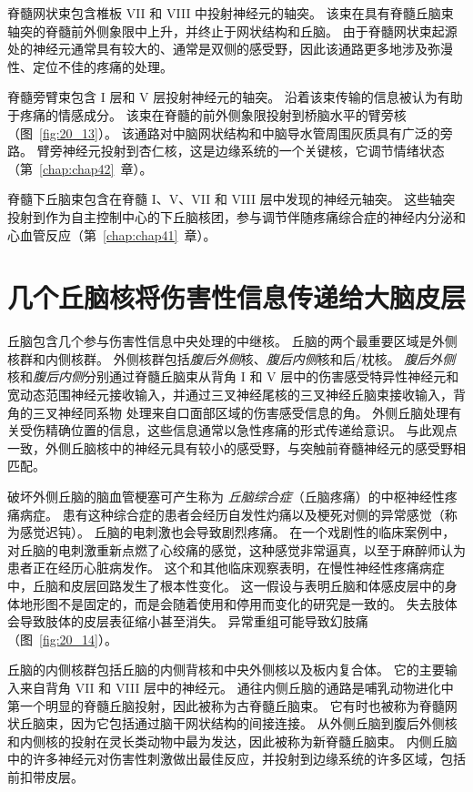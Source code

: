 脊髓网状束包含椎板 VII 和 VIII 中投射神经元的轴突。
该束在具有脊髓丘脑束轴突的脊髓前外侧象限中上升，并终止于网状结构和丘脑。
由于脊髓网状束起源处的神经元通常具有较大的、通常是双侧的感受野，因此该通路更多地涉及弥漫性、定位不佳的疼痛的处理。


脊髓旁臂束包含 I 层和 V 层投射神经元的轴突。
沿着该束传输的信息被认为有助于疼痛的情感成分。
该束在脊髓的前外侧象限投射到桥脑水平的臂旁核（图~\ref{fig:20_13}）。
该通路对中脑网状结构和中脑导水管周围灰质具有广泛的旁路。
臂旁神经元投射到杏仁核，这是边缘系统的一个关键核，它调节情绪状态（第~\ref{chap:chap42}~章）。


脊髓下丘脑束包含在脊髓 I、V、VII 和 VIII 层中发现的神经元轴突。
这些轴突投射到作为自主控制中心的下丘脑核团，参与调节伴随疼痛综合症的神经内分泌和心血管反应（第~\ref{chap:chap41}~章）。



\section{几个丘脑核将伤害性信息传递给大脑皮层}

丘脑包含几个参与伤害性信息中央处理的中继核。
丘脑的两个最重要区域是外侧核群和内侧核群。
外侧核群包括\textit{腹后外侧}核、\textit{腹后内侧}核和后/枕核。
\textit{腹后外侧}核和\textit{腹后内侧}分别通过脊髓丘脑束从背角 I 和 V 层中的伤害感受特异性神经元和宽动态范围神经元接收输入，并通过三叉神经尾核的三叉神经丘脑束接收输入，背角的三叉神经同系物 处理来自口面部区域的伤害感受信息的角。
外侧丘脑处理有关受伤精确位置的信息，这些信息通常以急性疼痛的形式传递给意识。
与此观点一致，外侧丘脑核中的神经元具有较小的感受野，与突触前脊髓神经元的感受野相匹配。


破坏外侧丘脑的脑血管梗塞可产生称为 \textit{丘脑综合症}（丘脑疼痛）的中枢神经性疼痛病症。
患有这种综合症的患者会经历自发性灼痛以及梗死对侧的异常感觉（称为感觉迟钝）。
丘脑的电刺激也会导致剧烈疼痛。
在一个戏剧性的临床案例中，对丘脑的电刺激重新点燃了心绞痛的感觉，这种感觉非常逼真，以至于麻醉师认为患者正在经历心脏病发作。
这个和其他临床观察表明，在慢性神经性疼痛病症中，丘脑和皮层回路发生了根本性变化。
这一假设与表明丘脑和体感皮层中的身体地形图不是固定的，而是会随着使用和停用而变化的研究是一致的。
失去肢体会导致肢体的皮层表征缩小甚至消失。
异常重组可能导致幻肢痛（图~\ref{fig:20_14}）。


丘脑的内侧核群包括丘脑的内侧背核和中央外侧核以及板内复合体。
它的主要输入来自背角 VII 和 VIII 层中的神经元。 
通往内侧丘脑的通路是哺乳动物进化中第一个明显的脊髓丘脑投射，因此被称为古脊髓丘脑束。
它有时也被称为脊髓网状丘脑束，因为它包括通过脑干网状结构的间接连接。
从外侧丘脑到腹后外侧核和内侧核的投射在灵长类动物中最为发达，因此被称为新脊髓丘脑束。
内侧丘脑中的许多神经元对伤害性刺激做出最佳反应，并投射到边缘系统的许多区域，包括前扣带皮层。




